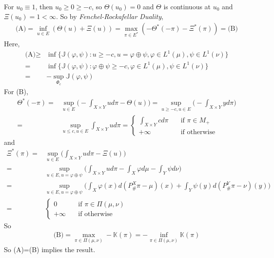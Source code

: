 \documentclass[12pt,a4paper]{article}
\newenvironment{proof}
{\begin{changemargin}{1cm}{0.5cm} 
	}%
	{\end{changemargin}
}
\newenvironment{p}
{\begin{proof} 
	}%
	{\end{proof}
}
\begin{document}
\begin{p}
\quad For $u_0\equiv 1$, then $u_0\geq 0 \geq -c$, so $\Theta(u_0)=0$ and $\Theta$ is continuous at $u_0$ and $\Xi(u_0) =1 < \infty$. So by \emph{Fenchel-Rockafellar Duality},
\begin{align*}
\text{(A)} = \inf_{u\in E}(\Theta(u) + \Xi(u)) = \max_{\pi \in E^*}(-\Theta^*(- \pi)- \Xi^*(\pi)) = \text{(B)}
\end{align*}
Here,
\begin{align*}
\text{(A)} \geq &\inf \big\{\mathbb{J}(\varphi, \psi) : u\geq -c, u = \varphi \oplus \psi, \varphi \in L^1(\mu), \psi \in L^1(\nu) \big\} \\
= & \inf \big\{\mathbb{J}(\varphi, \psi) : \varphi \oplus \psi \geq - c, \varphi \in L^1(\mu), \psi \in L^1(\nu) \big\} \\
= & - \sup_{\Phi_c} \mathbb{J}(\varphi, \psi)
\end{align*}
For (B), 
\begin{align*}
\Theta^*(-\pi) = &\sup_{u\in E}\Big( -\int_{X\times Y} ud\pi - \Theta(u)\Big) = \sup_{u\geq -c, u\in E} \Big( -\int_{X\times Y} y d\pi \Big) \\
=& \sup_{u\leq c, u\in E} \int_{X\times Y} ud\pi = \begin{cases}
\int_{X\times Y} cd\pi \quad &\text{if } \pi \in M_+ \\
+ \infty \quad &\text{if otherwise}
\end{cases}
\end{align*}
and
\begin{align*}
\Xi^*(\pi) =& \sup_{u\in E} \Big( \int_{X\times Y} u d\pi - \Xi(u) \Big) \\
=& \sup_{u\in E, u = \varphi \oplus \psi} \Big( \int_{X\times Y} ud\pi - \int_X \varphi d\mu - \int_Y \psi d\nu \Big) \\
=& \sup_{u\in E, u = \varphi \oplus \psi} \Big( \int_X \varphi(x) d(P^X_{\#}\pi- \mu)(x) + \int_{Y}\psi(y) d(P^{Y}_{\#}\pi - \nu)(y) \Big)\\
=& \begin{cases}
0 \quad & \text{if } \pi \in \Pi(\mu, \nu) \\
+\infty \quad & \text{if otherwise}
\end{cases}
\end{align*}
So
\begin{align*}
\text{(B)} = \max_{\pi \in \Pi(\mu, \nu)} - \mathbb{K}(\pi ) = -\inf_{\pi \in \Pi(\mu, \nu)} \mathbb{K}(\pi)
\end{align*}
So (A)=(B) implies the result.

\eop
\end{p}
\end{document}
